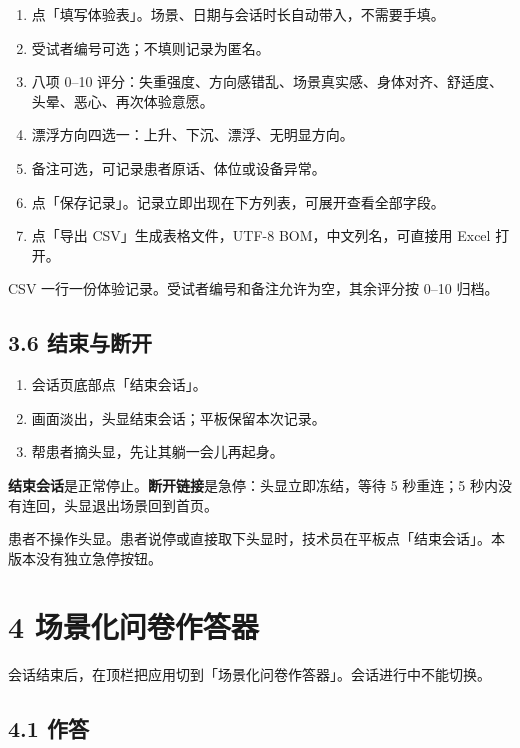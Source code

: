 \documentclass[
  chinese,
  letterpaper,
  DIV=11,
  numbers=noendperiod]{scrartcl}
\providecommand{\tightlist}{%
  \setlength{\itemsep}{0pt}\setlength{\parskip}{0pt}}
\begin{document}
\begin{enumerate}
\def\labelenumi{\arabic{enumi}.}
\tightlist
\item
  点「填写体验表」。场景、日期与会话时长自动带入，不需要手填。
\item
  受试者编号可选；不填则记录为匿名。
\item
  八项 0--10
  评分：失重强度、方向感错乱、场景真实感、身体对齐、舒适度、头晕、恶心、再次体验意愿。
\item
  漂浮方向四选一：上升、下沉、漂浮、无明显方向。
\item
  备注可选，可记录患者原话、体位或设备异常。
\item
  点「保存记录」。记录立即出现在下方列表，可展开查看全部字段。
\item
  点「导出 CSV」生成表格文件，UTF-8 BOM，中文列名，可直接用 Excel 打开。
\end{enumerate}

CSV 一行一份体验记录。受试者编号和备注允许为空，其余评分按 0--10 归档。

\subsection{3.6 结束与断开}\label{ux7ed3ux675fux4e0eux65adux5f00}

\begin{enumerate}
\def\labelenumi{\arabic{enumi}.}
\tightlist
\item
  会话页底部点「结束会话」。
\item
  画面淡出，头显结束会话；平板保留本次记录。
\item
  帮患者摘头显，先让其躺一会儿再起身。
\end{enumerate}

\textbf{结束会话}是正常停止。\textbf{断开链接}是急停：头显立即冻结，等待
5 秒重连；5 秒内没有连回，头显退出场景回到首页。

患者不操作头显。患者说停或直接取下头显时，技术员在平板点「结束会话」。本版本没有独立急停按钮。

\section{4
场景化问卷作答器}\label{ux573aux666fux5316ux95eeux5377ux4f5cux7b54ux5668}

会话结束后，在顶栏把应用切到「场景化问卷作答器」。会话进行中不能切换。

\subsection{4.1 作答}\label{ux4f5cux7b54}
\end{document}
